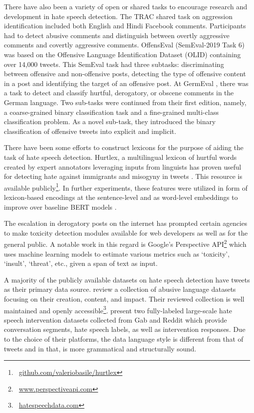 \documentclass[11pt,a4paper]{article}
\begin{document}
There have also been a variety of open or shared tasks to encourage research and development in hate speech detection. The TRAC shared task on aggression identification \cite{ws-2018-trolling} included both English and Hindi Facebook comments. Participants had to detect abusive comments and distinguish between overtly aggressive comments and covertly aggressive comments. OffensEval (SemEval-2019 Task 6) \cite{zampieri-etal-2019-semeval} was based on the Offensive Language Identification Dataset (OLID) containing over 14,000 tweets. This SemEval task had three subtasks: discriminating between offensive and non-offensive posts, detecting the type of offensive content in a post and identifying the target of an offensive post. At GermEval \cite{germeval-task-2}, there was a task to detect and classify hurtful, derogatory, or obscene comments in the German language. Two sub-tasks were continued from their first edition, namely, a coarse-grained binary classification task and a fine-grained multi-class classification problem. As a novel sub-task, they introduced the binary classification of offensive tweets into explicit and implicit.

There have been some efforts to construct lexicons for the purpose of aiding the task of hate speech detection. Hurtlex, a multilingual lexicon of hurtful words created by expert annotators leveraging inputs from linguists has proven useful for detecting hate against immigrants and misogyny in tweets \cite{hurtlex}. This resource is available publicly\footnote{\ \url{github.com/valeriobasile/hurtlex}}. In further experiments, these features were utilized in form of lexicon-based encodings at the sentence-level and as word-level embeddings to improve over baseline BERT models \cite{hurtbert}.

The escalation in derogatory posts on the internet has prompted certain agencies to make toxicity detection modules available for web developers as well as for the general public. A notable work in this regard is Google's Perspective API\footnote{\ \url{www.perspectiveapi.com}} which uses machine learning models to estimate various metrics such as `toxicity', `insult', `threat', etc., given a span of text as input.

A majority of the publicly available datasets on hate speech detection have tweets as their primary data source. \citet{hate-data} review a collection of abusive language datasets focusing on their creation, content, and impact. Their reviewed collection is well maintained and openly accessible\footnote{\ \url{hatespeechdata.com}}. \citet{benchmark} present two fully-labeled large-scale hate speech intervention datasets collected from Gab and Reddit which provide conversation segments, hate speech labels, as well as intervention responses. Due to the choice of their platforms, the data language style is different from that of tweets and in that, is more grammatical and structurally sound.
\end{document}
